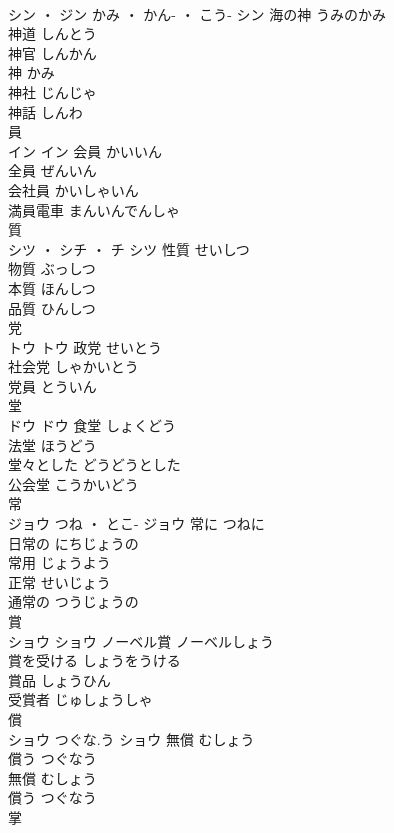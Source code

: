\documentclass[8pt]{extreport}
\begin{document}
\begin{CJK}{UTF8}{min}
\\	シン ・ ジン	かみ ・ かん- ・ こう-	シン	海の神	うみのかみ	
\\	神道	しんとう	
\\	神官	しんかん	
\\	神	かみ	
\\	神社	じんじゃ	
\\	神話	しんわ	
\\	員	
\\	イン		イン	会員	かいいん	
\\	全員	ぜんいん	
\\	会社員	かいしゃいん	
\\	満員電車	まんいんでんしゃ	
\\	質	
\\	シツ ・ シチ ・ チ		シツ	性質	せいしつ	
\\	物質	ぶっしつ	
\\	本質	ほんしつ	
\\	品質	ひんしつ	
\\	党	
\\	トウ		トウ	政党	せいとう	
\\	社会党	しゃかいとう	
\\	党員	とういん	
\\	堂	
\\	ドウ		ドウ	食堂	しょくどう	
\\	法堂	ほうどう	
\\	堂々とした	どうどうとした	
\\	公会堂	こうかいどう	
\\	常	
\\	ジョウ	つね ・ とこ-	ジョウ	常に	つねに	
\\	日常の	にちじょうの	
\\	常用	じょうよう	
\\	正常	せいじょう	
\\	通常の	つうじょうの	
\\	賞	
\\	ショウ		ショウ	ノーベル賞	ノーベルしょう	
\\	賞を受ける	しょうをうける	
\\	賞品	しょうひん	
\\	受賞者	じゅしょうしゃ	
\\	償	
\\	ショウ	つぐな.う	ショウ	無償	むしょう	
\\	償う	つぐなう	
\\	無償	むしょう	
\\	償う	つぐなう	
\\	掌	

\end{CJK}
\end{document}
